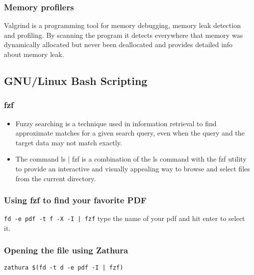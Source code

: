 \documentclass[titlepage]{article}
\begin{document}
\subsubsection{Memory profilers}
Valgrind is a programming tool for memory debugging, memory leak detection and profiling.
By scanning the program it detects everywhere that memory was dynamically allocated but never been deallocated and provides detailed info about memory leak.

\subsection{GNU/Linux Bash Scripting}
\subsubsection{fzf}
\begin{itemize}
    \item Fuzzy searching is a technique used in information retrieval to find approximate matches for a given search query, even when the query and the target data may not match exactly.
    \item The command ls | fzf is a combination of the ls command with the fzf utility to provide an interactive and visually appealing way to browse and select files from the current directory.
\end{itemize}

\subsubsection{ Using fzf to find your favorite PDF}
\texttt{fd -e pdf -t f -X -I | fzf}
type the name of your pdf and hit enter to select it.

\subsubsection{Opening the file using Zathura}
\texttt{zathura \$(fd -t d -e pdf -I | fzf)}
\end{document}
